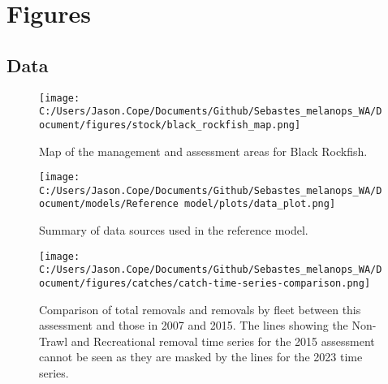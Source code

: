 \documentclass[11pt,
  letterpaper,
]{article}
\begin{document}
\newpage





\newpage













\newpage



\clearpage

\clearpage


\hypertarget{figures}{%
\section{Figures}\label{figures}}

\hypertarget{data}{%
\subsection{Data}\label{data}}

\begin{figure}
{\centering
\texttt{[image: C:/Users/Jason.Cope/Documents/Github/Sebastes\_melanops\_WA/Document/figures/stock/black\_rockfish\_map.png]}
}
\caption{Map of the management and assessment areas for Black Rockfish.\label{fig:map}}
\end{figure}

\pagebreak

\begin{figure}
{\centering
\texttt{[image: C:/Users/Jason.Cope/Documents/Github/Sebastes\_melanops\_WA/Document/models/Reference model/plots/data\_plot.png]}
}
\caption{Summary of data sources used in the reference model.\label{fig:data-plot}}
\end{figure}

\pagebreak

\begin{figure}
{\centering
\texttt{[image: C:/Users/Jason.Cope/Documents/Github/Sebastes\_melanops\_WA/Document/figures/catches/catch-time-series-comparison.png]}
}
\caption{Comparison of total removals and removals by fleet between this assessment and those in 2007 and 2015. The lines showing the Non-Trawl and Recreational removal time series for the 2015 assessment cannot be seen as they are masked by the lines for the 2023 time series.\label{fig:catch-ts-comparison}}
\end{figure}
\end{document}
